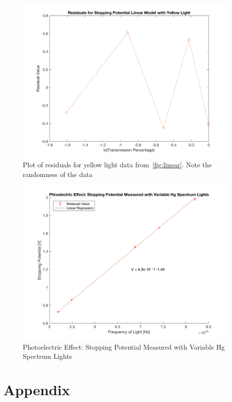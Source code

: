 \documentclass[]{article}
\begin{document}
\begin{figure}[H]
    \includegraphics[width=\textwidth]{../img/residyellow.png}
    \caption{Plot of residuals for yellow light data from~\ref{fig:linear}. Note
    the randomness of the data}\label{fig:residyellow}
\end{figure}

\newpage
\begin{figure}[H]
    \includegraphics[width=\textwidth]{../img/stopping.png}
    \caption{Photoelectric Effect: Stopping Potential Measured with Variable Hg
    Spectrum Lights}\label{fig:frequency}
\end{figure}
\newpage

\section{Appendix}
\end{document}
